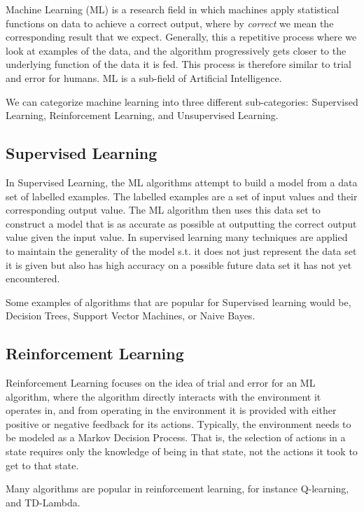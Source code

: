 Machine Learning (ML) is a research field in which machines apply statistical functions on data to achieve a correct output, where by \textit{correct} we mean the corresponding result that we expect. Generally, this a repetitive process where we look at examples of the data, and the algorithm progressively gets closer to the underlying function of the data it is fed. This process is therefore similar to trial and error for humans. ML is a sub-field of Artificial Intelligence.

We can categorize machine learning into three different sub-categories: Supervised Learning, Reinforcement Learning, and Unsupervised Learning.

\subsection{Supervised Learning}

In Supervised Learning, the ML algorithms attempt to build a model from a data set of labelled examples. The labelled examples are a set of input values and their corresponding output value. The ML algorithm then uses this data set to construct a model that is as accurate as possible at outputting the correct output value given the input value. In supervised learning many techniques are applied to maintain the generality of the model s.t. it does not just represent the data set it is given but also has high accuracy on a possible future data set it has not yet encountered.

Some examples of algorithms that are popular for Supervised learning would be, Decision Trees, Support Vector Machines, or Naive Bayes.

\subsection{Reinforcement Learning}

Reinforcement Learning focuses on the idea of trial and error for an ML algorithm, where the algorithm directly interacts with the environment it operates in, and from operating in the environment it is provided with either positive or negative feedback for its actions. Typically, the environment needs to be modeled as a Markov Decision Process. That is, the selection of actions in a state requires only the knowledge of being in that state, not the actions it took to get to that state.

Many algorithms are popular in reinforcement learning, for instance Q-learning\cite{qlearning:watkins}, and TD-Lambda\cite{sutton:tdlambda}.

